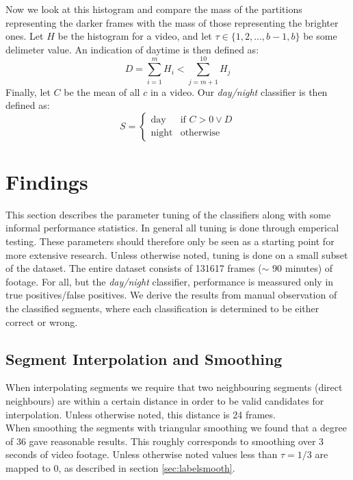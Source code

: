 %
Now we look at this histogram and compare the mass of the partitions representing the darker frames with the mass of those representing the brighter ones. Let $H$ be the histogram for a video, and let $\tau \in \{1,2,...,b-1,b\}$ be some delimeter value. An indication of daytime is then defined as:
%
\begin{equation}
D = \sum_{i=1}^{m}H_{i} < \sum_{j=m+1}^{10}H_{j}
\end{equation}
%
Finally, let $C$ be the mean of all $c$ in a video. Our \textit{day/night} classifier is then defined as:
\begin{equation}
S =
\begin{cases}
\text{day} & \text{if } C > 0 \vee D \\
\text{night} &  \text{otherwise}
\end{cases}
\end{equation}
%
%
\section{Findings}
%
This section describes the parameter tuning of the classifiers along with some informal performance statistics. In general all tuning is done through emperical testing. These parameters should therefore only be seen as a starting point for more extensive research. Unless otherwise noted, tuning is done on a small subset of the dataset. The entire dataset consists of 131617 frames ($\sim$ 90 minutes) of footage. For all, but the \textit{day/night} classifier, performance is meassured only in true positives/false positives. We derive the results from manual observation of the classified segments, where each classification is determined to be either correct or wrong.\\
%
\subsection{Segment Interpolation and Smoothing}
%
When interpolating segments we require that two neighbouring segments (direct neighbours) are within a certain distance in order to be valid candidates for interpolation. Unless otherwise noted, this distance is 24 frames.\\
When smoothing the segments with triangular smoothing we found that a degree of 36 gave reasonable results. This roughly corresponds to smoothing over 3 seconds of video footage. Unless otherwise noted values less than $\tau=1/3$ are mapped to 0, as described in section \ref{sec:labelsmooth}.
%
